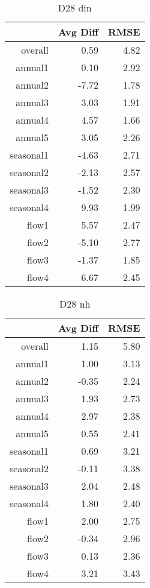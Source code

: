\begin{table}[H]
\centering
\begin{tabular}{rrr}
  \hline
 & Avg Diff & RMSE \\ 
  \hline
overall & 0.59 & 4.82 \\ 
  annual1 & 0.10 & 2.92 \\ 
  annual2 & -7.72 & 1.78 \\ 
  annual3 & 3.03 & 1.91 \\ 
  annual4 & 4.57 & 1.66 \\ 
  annual5 & 3.05 & 2.26 \\ 
  seasonal1 & -4.63 & 2.71 \\ 
  seasonal2 & -2.13 & 2.57 \\ 
  seasonal3 & -1.52 & 2.30 \\ 
  seasonal4 & 9.93 & 1.99 \\ 
  flow1 & 5.57 & 2.47 \\ 
  flow2 & -5.10 & 2.77 \\ 
  flow3 & -1.37 & 1.85 \\ 
  flow4 & 6.67 & 2.45 \\ 
   \hline
\end{tabular}
\caption{D28 din} 
\end{table}
\begin{table}[H]
\centering
\begin{tabular}{rrr}
  \hline
 & Avg Diff & RMSE \\ 
  \hline
overall & 1.15 & 5.80 \\ 
  annual1 & 1.00 & 3.13 \\ 
  annual2 & -0.35 & 2.24 \\ 
  annual3 & 1.93 & 2.73 \\ 
  annual4 & 2.97 & 2.38 \\ 
  annual5 & 0.55 & 2.41 \\ 
  seasonal1 & 0.69 & 3.21 \\ 
  seasonal2 & -0.11 & 3.38 \\ 
  seasonal3 & 2.04 & 2.48 \\ 
  seasonal4 & 1.80 & 2.40 \\ 
  flow1 & 2.00 & 2.75 \\ 
  flow2 & -0.34 & 2.96 \\ 
  flow3 & 0.13 & 2.36 \\ 
  flow4 & 3.21 & 3.43 \\ 
   \hline
\end{tabular}
\caption{D28 nh} 
\end{table}
